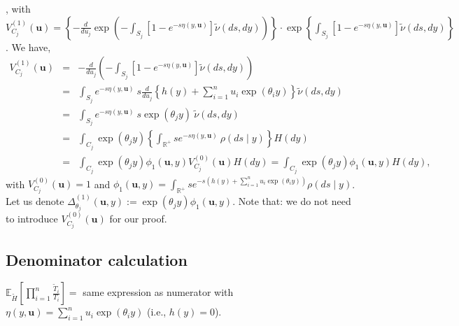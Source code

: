 \documentclass[10pt, oneside]{article}   	%
\renewcommand{\th}{\theta}
\newcommand{\thh}{\widetilde{H}}
\newcommand{\E}{\mathbb{E}}
\newcommand{\R}{\mathbb{R}}
\newcommand{\ub}{\mathbf{u}}
\begin{document}
, with $V^{(1)}_{C_j}(\ub) = \left\{- \frac{d}{du_j}  \exp \left( - \int_{S_j} \left[1 - e^{- s \eta(y, \ub)} \right] \widetilde{\nu}(ds, dy)\right) \right\} \cdot \exp \left \{ \int_{S_j} \left[1 - e^{- s \eta(y, \ub)} \right] \widetilde{\nu}(ds, dy)\right\}$. We have,
\begin{eqnarray*}
   V^{(1)}_{C_j}(\ub) & = & - \frac{d}{du_j}  \left( - \int_{S_j} \left[1 - e^{- s \eta(y, \ub)} \right] \widetilde{\nu}(ds, dy)\right) \\
   & = & \int_{S_j} e^{- s \eta(y, \ub)} \ s \frac{d}{du_j}  \left\{h(y) + \sum_{i=1}^n u_i \exp (\th_i y) \right\} \widetilde{\nu}(ds, dy) \\
   & = & \int_{S_j} e^{- s \eta(y, \ub)} \ s \exp (\th_j y) \  \widetilde{\nu}(ds, dy) \\
    & = & \int_{C_j} \exp (\th_j y)  \left\{\int_{\R^{+}} s e^{- s \eta(y, \ub)} \  \rho(ds \mid y) \right\} H(dy) \\
   & = & \int_{C_j} \exp (\th_j y)  \phi_{1}(\ub, y) V^{(0)}_{C_j}(\ub) H(dy) =  \int_{C_j}  \exp (\th_j y)  \phi_{1}(\ub, y) H(dy),
\end{eqnarray*}
with $V^{(0)}_{C_j}(\ub) = 1$ and $\phi_{1}(\ub, y) = \int_{\R^{+}} s e^{-s\left(h(y) + \sum_{i=1}^n u_i \exp(\th_i y)\right)} \rho(ds \mid y)$. Let us denote $\Delta^{(1)}_{\th_j} (\ub, y) := \exp (\th_j y)  \phi_{1}(\ub, y)$. Note that: we do not need to introduce $V^{(0)}_{C_j}(\ub)$ for our proof. 
\subsection{Denominator calculation}
$\E_{\thh}\left[\prod_{i = 1}^n \frac{\widetilde T_i}{T_i}\right] = $ same expression as numerator with $ \eta(y, \ub) =  \sum_{i=1}^n u_i \exp (\th_i y)$ (i.e., $h(y) = 0$).
\end{document}
